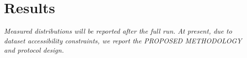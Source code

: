 \section{Results}
\textit{Measured distributions will be reported after the full run. At present, due to dataset accessibility constraints, we report the PROPOSED METHODOLOGY and protocol design.}
